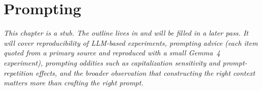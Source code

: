 %

\chapter{Prompting}
\label{ch:prompting}

\textit{This chapter is a stub. The outline lives in}
 \textit{and will be filled in a later
pass. It will cover reproducibility of LLM-based experiments, prompting
advice (each item quoted from a primary source and reproduced with a
small Gemma~4 experiment), prompting oddities such as capitalization
sensitivity and prompt-repetition effects, and the broader observation
that constructing the right \emph{context} matters more than crafting
the right \emph{prompt}.}
